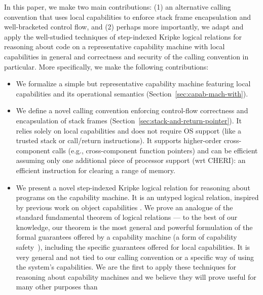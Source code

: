 \documentclass[format=acmsmall, review=true, screen=true]{acmart}
\renewcommand{\sectionname}{Section}
\newcommand\dominique[1]{{\color{purple} \sf \footnotesize {DD: #1}}\\}
\renewcommand\dominique[1]{}
\begin{document}
\dominique{I think we should include a comparison with the conference paper, and explain what the delta is for this journal version.}
In this paper, we make two main contributions: (1) an alternative calling
convention that uses local capabilities to enforce stack frame encapsulation and
well-bracketed control flow, and (2) perhaps more importantly, we adapt and
apply the well-studied techniques of step-indexed Kripke logical relations for
reasoning about code on a representative capability machine with local
capabilities in general and correctness and security of the calling convention
in particular. More specifically, we make the following contributions:
\begin{itemize}
\item We formalize a simple but representative capability machine featuring local
  capabilities and its operational semantics
  (\sectionname~\ref{sec:capab-mach-with}).
\item We define a novel calling convention enforcing control-flow correctness and
  encapsulation of stack frames (\sectionname~\ref{sec:stack-and-return-pointer}). It
  relies solely on local capabilities and does not require OS support (like a
  trusted stack or call/return instructions).
  It supports higher-order cross-component calls (e.g., cross-component function
  pointers) and can be efficient assuming only one additional piece of processor
  support (wrt CHERI): an efficient instruction for clearing a range of memory.
\item We present a novel step-indexed Kripke logical relation for reasoning
  about programs on the capability machine. It is an untyped logical relation,
  inspired by previous work on object capabilities \citep{Devriese:2016ObjCap}.
  We prove an analogue of the standard fundamental theorem of logical relations
  --- to the best of our knowledge, our theorem is %
  the most general and powerful formulation of the formal guarantees offered by
  a capability machine (a form of capability
  safety~\citep{Devriese:2016ObjCap,Maffeis2010OC}), including the specific
  guarantees offered for local capabilities. It is very general and not tied to
  our calling convention or a specific way of using the system's capabilities.
  We are the first to apply these techniques for reasoning about capability
  machines and we believe they will prove useful for many other purposes than

\end{itemize}
\end{document}
